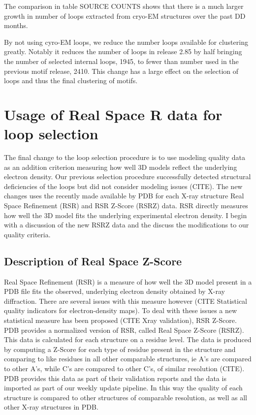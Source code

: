 \begin{table}
  \begin{tabular}
  \end{tabular}
\end{table}

The comparison in table SOURCE COUNTS shows that there is a much larger growth
in number of loops extracted from cryo-EM structures over the past DD months. 

By not using cyro-EM loops, we reduce the number loops available for clustering
greatly. Notably it reduces the number of loops in release 2.85 by half bringing
the number of selected internal loops, 1945, to fewer than number used in the
previous motif release, 2410. This change has a large effect on the selection of
loops and thus the final clustering of motifs. 

\section{Usage of Real Space R data for loop selection}

The final change to the loop selection procedure is to use modeling quality data
as an addition criterion measuring how well 3D models reflect the underlying
electron density. Our previous selection procedure successfully detected
structural deficiencies of the loops but did not consider modeling issues
(CITE). The new changes uses the recently made available by PDB for each X-ray
structure Real Space Refinement (RSR) and RSR Z-Score (RSRZ) data. RSR directly
measures how well the 3D model fits the underlying experimental electron
density. I begin with a discussion of the new RSRZ data and the discuss the
modifications to our quality criteria.

\subsection{Description of Real Space Z-Score}

Real Space Refinement (RSR) is a measure of how well the 3D model present in a
PDB file fits the observed, underlying electron density obtained by X-ray
diffraction. There are several issues with this measure however (CITE
Statistical quality indicators for electron-density maps). To deal with these
issues a new statistical measure has been proposed (CITE Xray validation), RSR
Z-Score. PDB provides a normalized version of RSR, called Real Space Z-Score
(RSRZ). This data is calculated for each structure on a residue level. The data
is produced by computing a Z-Score for each type of residue present in the
structure and comparing to like residues in all other comparable structures, ie
A’s are compared to other A’s, while C’s are compared to other C’s, of similar
resolution (CITE). PDB provides this data as part of their validation reports
and the data is imported as part of our weekly update pipeline. In this way the
quality of each structure is compared to other structures of comparable
resolution, as well as all other X-ray structures in PDB.

